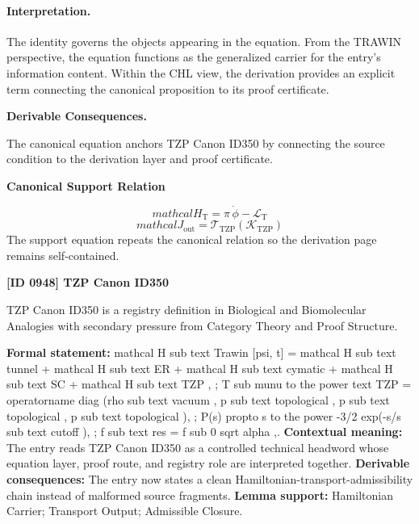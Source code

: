 \paragraph{Interpretation.}
The identity governs the objects appearing in the equation. From the TRAWIN perspective, the equation functions as the generalized carrier for the entry’s information content. Within the CHL view, the derivation provides an explicit term connecting the canonical proposition to its proof certificate.

\par\vspace{0.35em}
\noindent\textbf{Derivable Consequences.}\quad
\begingroup
\footnotesize
\raggedright
The canonical equation anchors TZP Canon ID350 by connecting the source condition to the derivation layer and proof certificate.
\par\endgroup

\noindent\textbf{Canonical Support Relation}\par
\[
mathcal{H}_{\mathrm{T}}=\pi\,\dot{\phi}-\mathcal{L}_{\mathrm{T}}
\]
\[
mathcal{J}_{\mathrm{out}} = \mathcal{T}_{\mathrm{TZP}}\!\left(\mathcal{K}_{\mathrm{TZP}}\right)
\]
\noindent The support equation repeats the canonical relation so the derivation page remains self-contained.\par

\clearpage
\noindent\textbf{[ID 0948] TZP Canon ID350}\par
\vspace{0.35em}
\begingroup\small
{}
TZP Canon ID350 is a registry definition in Biological and Biomolecular Analogies with secondary pressure from Category Theory and Proof Structure.

\begingroup\footnotesize\setlength{\emergencystretch}{3em}\sloppy
\textbf{Formal statement:} mathcal H sub text Trawin [psi, t] = mathcal H sub text tunnel + mathcal H sub text ER + mathcal H sub text cymatic + mathcal H sub text SC + mathcal H sub text TZP , ; T sub munu to the power text TZP = operatorname diag (rho sub text vacuum , p sub text topological , p sub text topological , p sub text topological ), ; P(s) propto s to the power -3/2 exp(-s/s sub text cutoff ), ; f sub text res = f sub 0 sqrt alpha ,. \textbf{Contextual meaning:} The entry reads TZP Canon ID350 as a controlled technical headword whose equation layer, proof route, and registry role are interpreted together. \textbf{Derivable consequences:} The entry now states a clean Hamiltonian-transport-admissibility chain instead of malformed source fragments. \textbf{Lemma support:} Hamiltonian Carrier; Transport Output; Admissible Closure.\par
\endgroup

